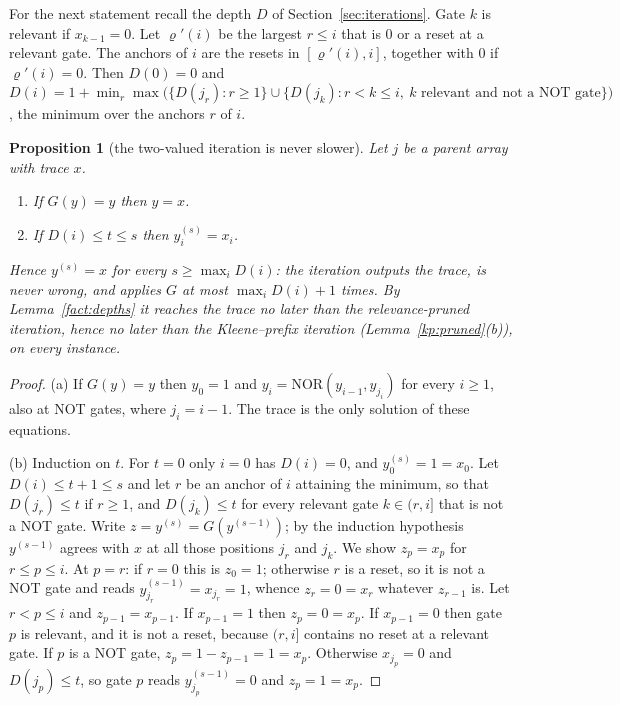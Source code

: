 \documentclass[11pt]{amsart}
\newtheorem{proposition}[theorem]{Proposition}
\theoremstyle{definition}
\theoremstyle{remark}
\newcommand{\NOR}{\mathrm{NOR}}
\begin{document}
For the next statement recall the depth $D$ of Section~\ref{sec:iterations}. Gate $k$ is relevant if
$x_{k-1}=0$. Let $\varrho'(i)$ be the largest $r\le i$ that is $0$ or a reset at a relevant gate.
The anchors of $i$ are the resets in $[\varrho'(i),i]$, together with $0$ if $\varrho'(i)=0$. Then
$D(0)=0$ and $D(i)=1+\min_r\max\bigl(\{D(j_r):r\ge1\}\cup\{D(j_k):r<k\le i,\ k\text{ relevant and
not a NOT gate}\}\bigr)$, the minimum over the anchors $r$ of $i$.

\begin{proposition}[the two-valued iteration is never slower]\label{prop:jacobi}
Let $j$ be a parent array with trace $x$.
\begin{enumerate}[label=(\alph*),leftmargin=2.4em]
\item If $G(y)=y$ then $y=x$.
\item If $D(i)\le t\le s$ then $y^{(s)}_i=x_i$.
\end{enumerate}
Hence $y^{(s)}=x$ for every $s\ge\max_iD(i)$: the iteration outputs the trace, is never wrong,
and applies $G$ at most $\max_iD(i)+1$ times. By Lemma~\ref{fact:depths} it reaches the trace no
later than the relevance-pruned iteration, hence no later than the Kleene--prefix iteration
(Lemma~\ref{kp:pruned}(b)), on every instance.
\end{proposition}

\begin{proof}
(a) If $G(y)=y$ then $y_0=1$ and $y_i=\NOR(y_{i-1},y_{j_i})$ for every $i\ge1$, also at NOT
gates, where $j_i=i-1$. The trace is the only solution of these equations.

(b) Induction on $t$. For $t=0$ only $i=0$ has $D(i)=0$, and $y^{(s)}_0=1=x_0$. Let $D(i)\le t+1\le
s$ and let $r$ be an anchor of $i$ attaining the minimum, so that $D(j_r)\le t$ if $r\ge1$, and
$D(j_k)\le t$ for every relevant gate $k\in(r,i]$ that is not a NOT gate. Write $z=y^{(s)}=G(y^{(s-1)})$;
by the induction hypothesis $y^{(s-1)}$ agrees with $x$ at all those positions $j_r$ and $j_k$.
We show $z_p=x_p$ for $r\le p\le i$. At $p=r$: if $r=0$ this is $z_0=1$; otherwise $r$ is a reset,
so it is not a NOT gate and reads $y^{(s-1)}_{j_r}=x_{j_r}=1$, whence $z_r=0=x_r$ whatever
$z_{r-1}$ is. Let $r<p\le i$ and $z_{p-1}=x_{p-1}$. If $x_{p-1}=1$ then $z_p=0=x_p$. If
$x_{p-1}=0$ then gate $p$ is relevant, and it is not a reset, because $(r,i]$ contains no reset at
a relevant gate. If $p$ is a NOT gate, $z_p=1-z_{p-1}=1=x_p$. Otherwise $x_{j_p}=0$ and
$D(j_p)\le t$, so gate $p$ reads $y^{(s-1)}_{j_p}=0$ and $z_p=1=x_p$.
\end{proof}
\end{document}
